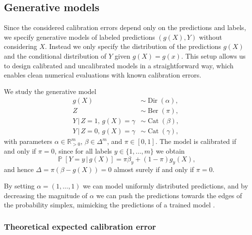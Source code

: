 \documentclass{article}
\DeclareMathOperator{\Prob}{\mathbb{P}}
\DeclareMathOperator{\Ber}{Ber}
\DeclareMathOperator{\Dir}{Dir}
\DeclareMathOperator{\Categorical}{Cat}
\newcommand{\given}{\,|\,}
\begin{document}
\subsection{Generative models}\label{sec:generative_models}

Since the considered calibration errors depend only on the predictions and
labels, we specify generative models of labeled predictions $(g(X), Y)$ without
considering $X$. Instead we only specify the distribution of the predictions
$g(X)$ and the conditional distribution of $Y$ given $g(X) = g(x)$. This setup
allows us to design calibrated and uncalibrated models in a straightforward
way, which enables clean numerical evaluations with known calibration errors.

We study the generative model
\begin{align*}
  g(X) &\sim \Dir(\alpha), \\
  Z &\sim \Ber(\pi), \\
  Y \given Z = 1,\, g(X) = \gamma &\sim \Categorical(\beta),\\
  Y \given Z = 0,\, g(X) = \gamma &\sim \Categorical(\gamma),
\end{align*}
with parameters $\alpha \in \mathbb{R}_{>0}^m$, $\beta \in \Delta^m$, and
$\pi \in [0,1]$. The model is calibrated if and only if $\pi = 0$,
since for all labels $y \in \{1,\ldots,m\}$ we obtain
\begin{equation*}
  \Prob[Y = y \given g(X)] = \pi \beta_y + (1 - \pi) g_y(X),
\end{equation*}
and hence $\Delta = \pi (\beta - g(X)) = 0$ almost surely if and only if
$\pi = 0$.

By setting $\alpha = (1,\ldots,1)$ we can model uniformly distributed
predictions, and by decreasing the magnitude of $\alpha$ we can push the
predictions towards the edges of the probability simplex, mimicking the
predictions of a trained model
\citep[cf., e.g.,][]{vaicenavicius19_evaluat}.

\subsubsection{Theoretical expected calibration error}\label{sec:theoretical_ece}
\end{document}
